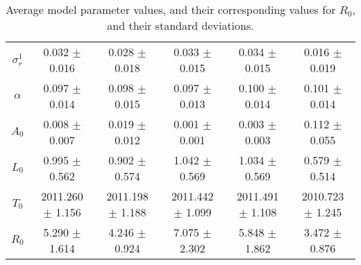 \begin{sidewaystable}
\begin{tabular}{cccccc}
{\bf $\sigma^1_r$} & 0.032 $\pm$ 0.016 & 0.028 $\pm$ 0.018 & 0.033 $\pm$ 0.015 & 0.034 $\pm$ 0.015 & 0.016 $\pm$ 0.019 \\
{\bf $\alpha$} & 0.097 $\pm$ 0.014 & 0.098 $\pm$ 0.015 & 0.097 $\pm$ 0.013 & 0.100 $\pm$ 0.014 & 0.101 $\pm$ 0.014 \\
{\bf $A_0$} & 0.008 $\pm$ 0.007 & 0.019 $\pm$ 0.012 & 0.001 $\pm$ 0.001 & 0.003 $\pm$ 0.003 & 0.112 $\pm$ 0.055 \\
{\bf $L_0$} & 0.995 $\pm$ 0.562 & 0.902 $\pm$ 0.574 & 1.042 $\pm$ 0.569 & 1.034 $\pm$ 0.569 & 0.579 $\pm$ 0.514 \\
{\bf $T_0$} & 2011.260 $\pm$ 1.156 & 2011.198 $\pm$ 1.188 & 2011.442 $\pm$ 1.099 & 2011.491 $\pm$ 1.108 & 2010.723 $\pm$ 1.245 \\
{\bf $R_0$} & 5.290 $\pm$ 1.614& 4.246 $\pm$ 0.924& 7.075 $\pm$ 2.302& 5.848 $\pm$ 1.862& 3.472 $\pm$ 0.876\\
\hline\hline
\end{tabular}
\caption{Average model parameter values, and their corresponding values for $R_0$,  and their standard deviations.}
\label{Table:Parameter_Values}
\end{sidewaystable}
